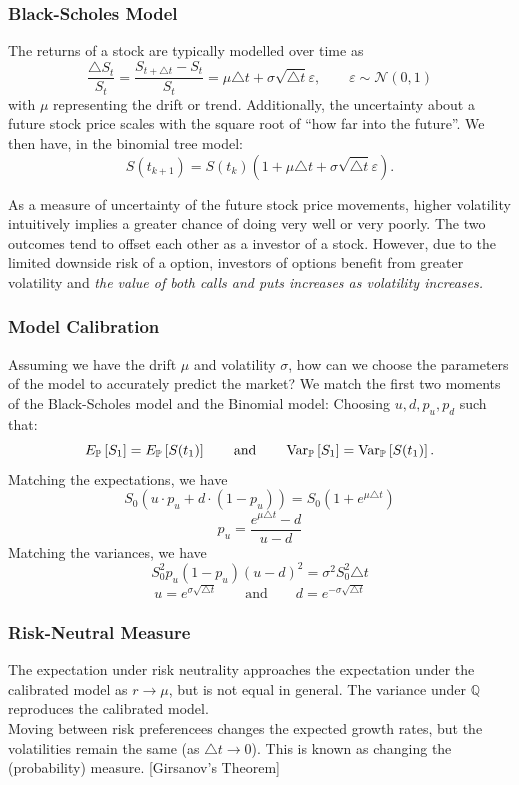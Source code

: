 \subsubsection{Black-Scholes Model}
The returns of a stock are typically modelled over time as
\[\frac{\triangle S_t}{S_t}=\frac{S_{t+\triangle t}-S_t}{S_t}=\mu\triangle t+\sigma\sqrt{\triangle t}\varepsilon,\qquad \varepsilon\sim\mathcal{N}\left( 0,1 \right)\]
with $\mu$ representing the drift or trend. Additionally, the uncertainty about
a future stock price scales with the square root of ``how far into the
future''. We then have, in the binomial tree model:
\[S(t_{k+1})=S(t_k)\left( 1+\mu\triangle t+\sigma \sqrt{\triangle t}\varepsilon \right).\] 
\begin{remark}
  As a measure of uncertainty of the future stock price movements, higher
  volatility intuitively implies a greater chance of doing very well or very
  poorly. The two outcomes tend to offset each other as a investor of a stock.
  However, due to the limited downside risk of a option, investors of options
  benefit from greater volatility and \textit{the value of both calls and puts
  increases as volatility increases.}
\end{remark}
\subsubsection{Model Calibration}
Assuming we have the drift $\mu$ and volatility $\sigma$, how can we choose the
parameters of the model to accurately predict the market? We match the first
two moments of the Black-Scholes model and the Binomial model: Choosing $u,d,p_u,p_d$ such that:
\[E_\mathbb{P}\left[ S_1 \right]=E_\mathbb{P}\left[ S(t_1) \right]\qquad\text{and}\qquad \operatorname{Var}_\mathbb{P}\left[ S_1 \right]=\operatorname{Var}_\mathbb{P}\left[ S(t_1) \right].\] 
Matching the expectations, we have
\[S_0(u\cdot p_u+d\cdot\left( 1-p_u\right) )=S_0(1+e^{\mu\triangle t})\]
\[p_u=\frac{e^{\mu\triangle t}-d}{u-d}\]
Matching the variances, we have
\[S_0^{2}p_u\left( 1-p_u \right) {\left( u-d \right)}^{2}=\sigma^{2}S_0^{2}\triangle t\]
\[u=e^{\sigma \sqrt{\triangle t}}\qquad\text{and}\qquad d=e^{-\sigma \sqrt{\triangle t}}\]
\subsubsection{Risk-Neutral Measure}
The expectation under risk neutrality approaches the expectation under the
calibrated model as $r\to \mu$, but is not equal in general. The variance under
$\mathbb{Q}$ reproduces the calibrated model.\\
Moving between risk preferencees changes the expected growth rates, but the
volatilities remain the same (as $\triangle t\to0$). This is known as changing the (probability)
measure. [Girsanov's Theorem]

